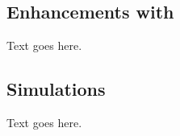 \subsection{Enhancements with \gadgettwo}
\label{subsec:gadget--subsection2}


Text goes here.




\subsection{Simulations}
\label{subsec:gadget--simulations}


Text goes here.





